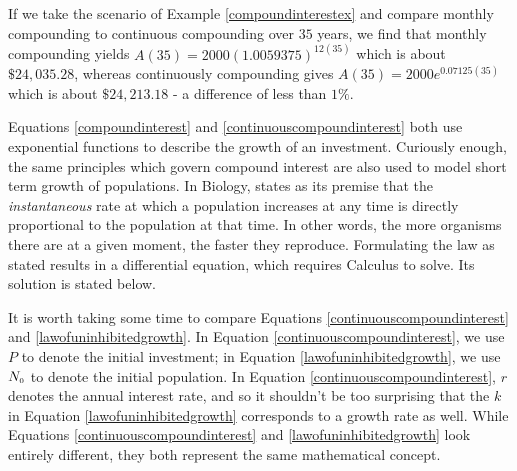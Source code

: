 \smallskip

If we take the scenario of Example \ref{compoundinterestex} and compare monthly compounding to continuous compounding over $35$ years, we find that monthly compounding yields $A(35) = 2000 (1.0059375)^{12(35)}$ which is about  $\$ 24,\!035.28$, whereas continuously compounding gives $A(35) = 2000e^{0.07125 (35)}$ which is about  $\$ 24,\!213.18$ - a difference of less than $1 \%$.

\smallskip

Equations \ref{compoundinterest} and \ref{continuouscompoundinterest} both use exponential functions to describe the growth of an investment.  Curiously enough, the same principles which govern compound interest are also used to model short term growth of populations.  In Biology,  states as its premise that the \textit{instantaneous}   rate at which a population increases at any time is directly proportional to the population at that time.  In other words, the more organisms there are at a given moment, the faster they reproduce.  Formulating the law as stated results in a differential equation, which requires Calculus to solve.  Its solution is stated below.


\smallskip


\smallskip 

 It is worth taking some time to compare Equations \ref{continuouscompoundinterest} and \ref{lawofuninhibitedgrowth}.  In  Equation \ref{continuouscompoundinterest}, we use $P$ to denote the initial investment;  in Equation \ref{lawofuninhibitedgrowth}, we use $N_{\mbox{\tiny$0$}}$ to denote the initial population.  In  Equation \ref{continuouscompoundinterest}, $r$ denotes the annual interest rate,  and so it shouldn't be too surprising that the $k$ in Equation \ref{lawofuninhibitedgrowth} corresponds to a growth rate as well.   While Equations \ref{continuouscompoundinterest} and \ref{lawofuninhibitedgrowth} look entirely different, they both represent the same mathematical concept.

